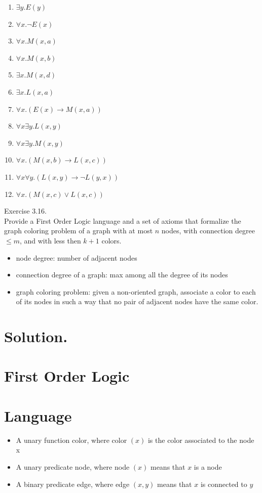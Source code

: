 \documentclass[10pt]{article}
\begin{document}
\begin{enumerate}
  \item $\exists y . E(y)$
  \item $\forall x . \neg E(x)$
  \item $\forall x . M(x, a)$
  \item $\forall x . M(x, b)$
  \item $\exists x . M(x, d)$
  \item $\exists x . L(x, a)$
  \item $\forall x .(E(x) \rightarrow M(x, a))$
  \item $\forall x \exists y . L(x, y)$
  \item $\forall x \exists y . M(x, y)$
  \item $\forall x .(M(x, b) \rightarrow L(x, c))$
  \item $\forall x \forall y .(L(x, y) \rightarrow \neg L(y, x))$
  \item $\forall x .(M(x, c) \vee L(x, c))$
\end{enumerate}

Exercise 3.16.\\
Provide a First Order Logic language and a set of axioms that formalize the graph coloring problem of a graph with at most $n$ nodes, with connection degree $\leq m$, and with less then $k+1$ colors.

\begin{itemize}
  \item node degree: number of adjacent nodes
  \item connection degree of a graph: max among all the degree of its nodes
  \item graph coloring problem: given a non-oriented graph, associate a color to each of its nodes in such a way that no pair of adjacent nodes have the same color.
\end{itemize}

\section{Solution.}
\section{First Order Logic}
\section{Language}
\begin{itemize}
  \item A unary function color, where color $(x)$ is the color associated to the node x
  \item A unary predicate node, where node $(x)$ means that $x$ is a node
  \item A binary predicate edge, where edge $(x, y)$ means that $x$ is connected to $y$
\end{itemize}
\end{document}
